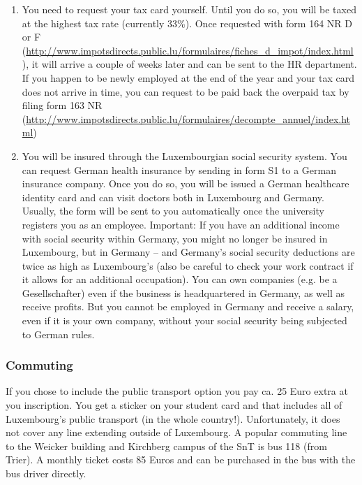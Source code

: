 \begin{enumerate}
\item You need to request your tax card yourself. Until you do so, you will be taxed at the highest tax rate (currently 33\%). Once requested with form 164 NR D or F (\url{http://www.impotsdirects.public.lu/formulaires/fiches_d_impot/index.html}), it will arrive a couple of weeks later and can be sent to the HR department. If you happen to be newly employed at the end of the year and your tax card does not arrive in time, you can request to be paid back the overpaid tax by filing form 163 NR (\url{http://www.impotsdirects.public.lu/formulaires/decompte_annuel/index.html})
\item You will be insured through the Luxembourgian social security system. You can request German health insurance by sending in form S1 to a German insurance company. Once you do so, you will be issued a German healthcare identity card and can visit doctors both in Luxembourg and Germany. Usually, the form will be sent to you automatically once the university registers you as an employee.
Important: If you have an additional income with social security within Germany, you might no longer be insured in Luxembourg, but in Germany – and Germany's social security deductions are twice as high as Luxembourg’s (also be careful to check your work contract if it allows for an additional occupation).
You can own companies (e.g. be a Gesellschafter) even if the business is headquartered in Germany, as well as receive profits. But you cannot be employed in Germany and receive a salary, even if it is your own company, without your social security being subjected to German rules.
\end{enumerate}

\subsubsection{Commuting}
If you chose to include the public transport option you pay ca. 25 Euro extra at you inscription. You get a sticker on your student card and that includes all of Luxembourg's public transport (in the whole country!). Unfortunately, it does not cover any line extending outside of Luxembourg.
A popular commuting line to the Weicker building and Kirchberg campus of the SnT is bus 118 (from Trier). A monthly ticket costs 85 Euros and can be purchased in the bus with the bus driver directly.

